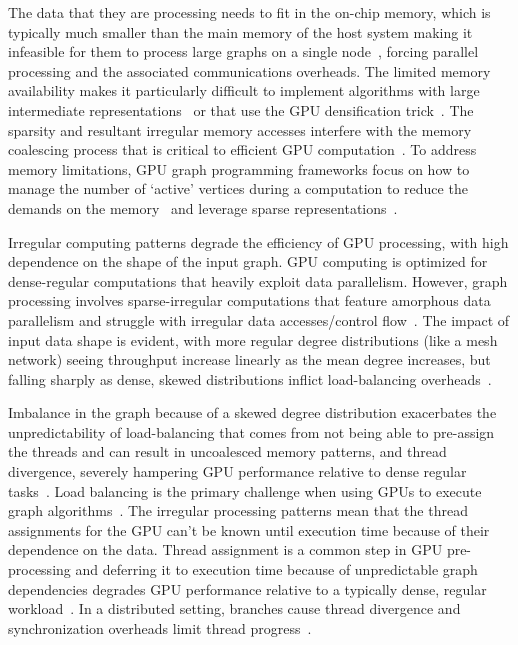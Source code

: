 The data that they are processing needs to fit in the on-chip memory, which is typically much smaller than the main memory of the host system making it infeasible for them to process large graphs on a single node~\cite{Aananthakrishnan2020}, forcing parallel processing and the associated communications overheads. 
The limited memory availability makes it particularly difficult to implement algorithms with large intermediate representations~\cite{Sundaram2015} or that use the GPU densification trick~\cite{Aananthakrishnan2020}.  
The sparsity and resultant irregular memory accesses interfere with the memory coalescing process that is critical to efficient GPU computation~\cite{Aananthakrishnan2020}.
To address memory limitations, GPU graph programming frameworks focus on how to manage the number of `active' vertices during a computation to reduce the demands on the memory~\cite{Wang2016} and leverage sparse representations~\cite{Liu2014,Wu2015}.

Irregular computing patterns degrade the efficiency of GPU processing, with high dependence on the shape of the input graph. 
GPU computing is optimized for dense-regular computations that heavily exploit data parallelism. 
However, graph processing involves sparse-irregular computations that feature amorphous data parallelism and struggle with irregular data accesses/control flow~\cite{Wang2016}.
The impact of input data shape is evident, with more regular degree distributions (like a mesh network) seeing throughput increase linearly as the mean degree increases, but falling sharply as dense, skewed distributions inflict load-balancing overheads~\cite{Wu2015}.

Imbalance in the graph because of a skewed degree distribution exacerbates the unpredictability of load-balancing that comes from not being able to pre-assign the threads and can result in uncoalesced memory patterns, and thread divergence, severely hampering GPU performance relative to dense regular tasks~\cite{Fu2014}. 
Load balancing is the primary challenge when using GPUs to execute graph algorithms~\cite{Wang2016}.
The irregular processing patterns mean that the thread assignments for the GPU can't be known until execution time because of their dependence on the data. 
Thread assignment is a common step in GPU pre-processing and deferring it to execution time because of unpredictable graph dependencies degrades GPU performance relative to a typically dense, regular workload~\cite{Fu2014}.
In a distributed setting, branches cause thread divergence and synchronization overheads limit thread progress~\cite{Aananthakrishnan2020}.

